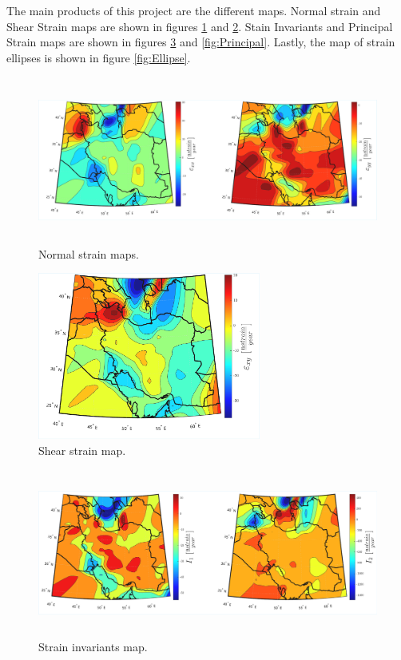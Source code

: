 \documentclass[12pt]{article}
\begin{document}
	The main products of this project are the different maps. Normal strain and Shear Strain maps are shown in figures \ref{fig:NormalStrain} and \ref{fig:ShearStrain}. Stain Invariants and Principal Strain maps are shown in figures \ref{fig:Invariants} and \ref{fig:Principal}. Lastly, the map of strain ellipses is shown in figure \ref{fig:Ellipse}.
	
	\begin{figure}[h!]
		\centering
		\includegraphics[height=5.5cm]{./Plots/NormalStrainMaps.pdf}
		\caption{Normal strain maps.}
		\label{fig:NormalStrain}
	\end{figure}
	
	\begin{figure}[h!]
		\centering
		\includegraphics[height=5.5cm]{./Plots/ShearStrainMap.pdf}
		\caption{Shear strain map.}
		\label{fig:ShearStrain}
	\end{figure}
	
	\begin{figure}[h!]
		\centering
		\includegraphics[height=5.5cm]{./Plots/StrainInvariants.pdf}
		\caption{Strain invariants map.}
		\label{fig:Invariants}
	\end{figure}
	
\end{document}
